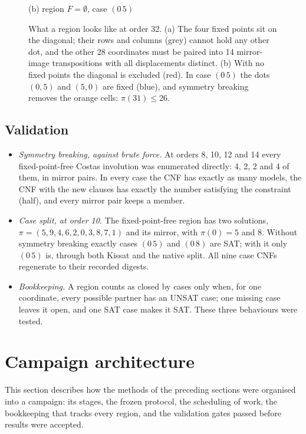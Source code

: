 \documentclass[11pt,a4paper]{article}
\theoremstyle{definition}
\begin{document}
\begin{figure}[H]
\begin{minipage}{0.47\linewidth}
\par\small (b) region $F=\emptyset$, case $(0\,5)$
\end{minipage}
\caption{What a region looks like at order 32. (a) The four fixed points sit on the
diagonal; their rows and columns (grey) cannot hold any other dot, and the other 28
coordinates must be paired into 14 mirror-image transpositions with all displacements
distinct. (b) With no fixed points the diagonal is excluded (red). In case $(0\,5)$ the dots
$(0,5)$ and $(5,0)$ are fixed (blue), and symmetry breaking removes the orange cells:
$\pi(31)\le 26$.}
\label{fig:regions32}
\end{figure}

\subsection{Validation}
\begingroup\sloppy
\begin{itemize}
\item \emph{Symmetry breaking, against brute force.} At orders 8, 10, 12 and 14 every
fixed-point-free Costas involution was enumerated directly: 4, 2, 2 and 4 of them, in mirror
pairs. In every case the CNF has exactly as many models, the CNF with the new clauses has
exactly the number satisfying the constraint (half), and every mirror pair keeps a member.
\item \emph{Case split, at order 10.} The fixed-point-free region has two solutions,
$\pi=(5,9,4,6,2,0,3,8,7,1)$ and its mirror, with $\pi(0)=5$ and $8$. Without symmetry
breaking exactly cases $(0\,5)$ and $(0\,8)$ are SAT; with it only $(0\,5)$ is, through both
Kissat and the native split. All nine case CNFs regenerate to their recorded digests.
\item \emph{Bookkeeping.} A region counts as closed by cases only when, for one coordinate,
every possible partner has an UNSAT case; one missing case leaves it open, and one SAT case
makes it SAT. These three behaviours were tested.
\end{itemize}
\endgroup

\section{Campaign architecture}\label{sec:campaign}
This section describes how the methods of the preceding sections were organised into a campaign: its stages, the frozen protocol, the scheduling of work, the bookkeeping that tracks every region, and the validation gates passed before results were accepted.
\end{document}
